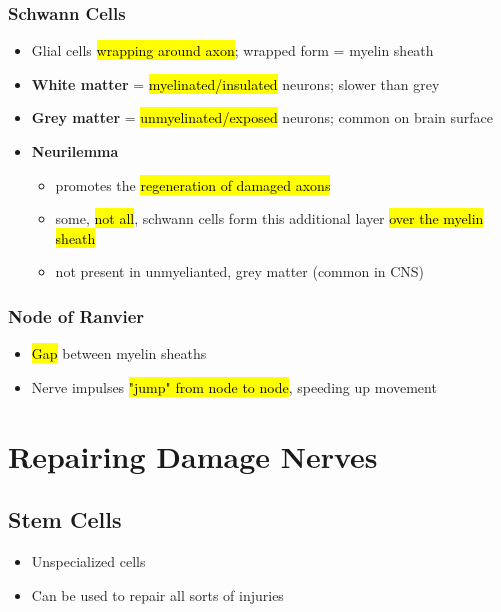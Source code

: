 \documentclass[a4paper,12pt]{article}
\begin{document}
\subsubsection{Schwann Cells}
\begin{itemize}
    \item{Glial cells \hl{wrapping around axon}; wrapped form = myelin sheath}
    \item{\textbf{White matter} = \hl{myelinated/insulated} neurons; slower than grey}
    \item{\textbf{Grey matter} = \hl{unmyelinated/exposed} neurons; common on brain surface}
    \item{
            \textbf{Neurilemma}
            \begin{itemize}
                \item{promotes the \hl{regeneration of damaged axons}}
                \item{some, \hl{not all}, schwann cells form this additional layer \hl{over the myelin sheath}}
                \item{not present in unmyelianted, grey matter (common in CNS)}
            \end{itemize}
        }

\end{itemize}

\subsubsection{Node of Ranvier}
\begin{itemize}
    \item{\hl{Gap} between myelin sheaths}
    \item{Nerve impulses \hl{"jump" from node to node}, speeding up movement}
\end{itemize}

\section{Repairing Damage Nerves}
\subsection{Stem Cells}
\begin{itemize}
    \item{Unspecialized cells}
    \item{Can be used to repair all sorts of injuries}
\end{itemize}
\end{document}
